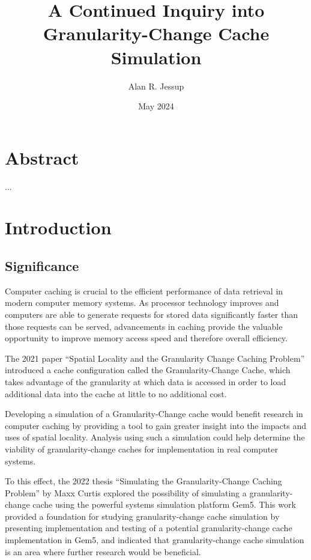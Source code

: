 \documentclass[12pt,twoside]{reedthesis}
\title{A Continued Inquiry into Granularity-Change Cache Simulation}
\author{Alan R. Jessup}
\date{May 2024}
\begin{document}
\maketitle
\frontmatter %
\pagestyle{empty}

\tableofcontents

\chapter*{Abstract}

...

\mainmatter
\pagestyle{fancyplain}

\chapter{Introduction}

\section{Significance}

Computer caching is crucial to the efficient performance of data retrieval in modern computer memory systems. As processor technology improves and computers are able to generate requests for stored data significantly faster than those requests can be served, advancements in caching provide the valuable opportunity to improve memory access speed and therefore overall efficiency.

The 2021 paper ``Spatial Locality and the Granularity Change Caching Problem'' introduced a cache configuration called the Granularity-Change Cache, which takes advantage of the granularity at which data is accessed in order to load additional data into the cache at little to no additional cost.

Developing a simulation of a Granularity-Change cache would benefit research in computer caching by providing a tool to gain greater insight into the impacts and uses of spatial locality. Analysis using such a simulation could help determine the viability of granularity-change caches for implementation in real computer systems.

To this effect, the 2022 thesis ``Simulating the Granularity-Change Caching Problem'' by Maxx Curtis explored the possibility of simulating a granularity-change cache using the powerful systems simulation platform Gem5. This work provided a foundation for studying granularity-change cache simulation by presenting implementation and testing of a potential granularity-change cache implementation in Gem5, and indicated that granularity-change cache simulation is an area where further research would be beneficial.
\end{document}
